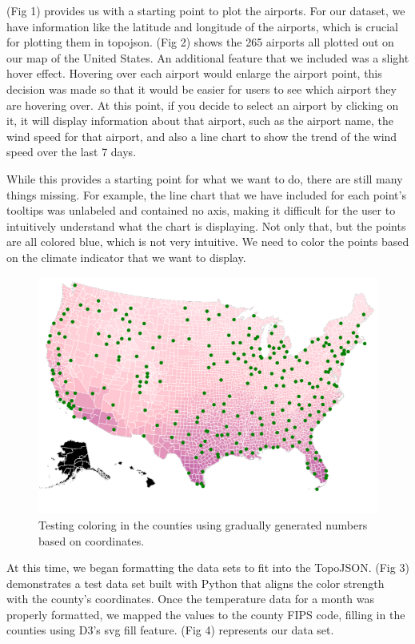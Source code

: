 \documentclass[10pt,twocolumn,twoside]{opticajnl}
\begin{document}
(Fig 1) provides us with a starting point to plot the airports. For our dataset, we have information like the latitude and longitude of the airports, which is crucial for plotting them in topojson. (Fig 2) shows the 265 airports all plotted out on our map of the United States. An additional feature that we included was a slight hover effect. Hovering over each airport would enlarge the airport point, this decision was made so that it would be easier for users to see which airport they are hovering over. At this point, if you decide to select an airport by clicking on it, it will display information about that airport, such as the airport name, the wind speed for that airport, and also a line chart to show the trend of the wind speed over the last 7 days.

While this provides a starting point for what we want to do, there are still many things missing. For example, the line chart that we have included for each point's tooltips was unlabeled and contained no axis, making it difficult for the user to intuitively understand what the chart is displaying. Not only that, but the points are all colored blue, which is not very intuitive. We need to color the points based on the climate indicator that we want to display.

\begin{figure}
	\centering
	\includegraphics[scale=0.25]{images/pinkStatesGradual.png}
	\caption{Testing coloring in the counties using gradually generated numbers based on coordinates.}
\end{figure}

At this time, we began formatting the data sets to fit into the TopoJSON. (Fig 3) demonstrates a test data set built with Python that aligns the color strength with the county's coordinates. Once the temperature data for a month was properly formatted, we mapped the values to the county FIPS code, filling in the counties using D3's svg fill feature. (Fig 4) represents our data set. 
\end{document}

